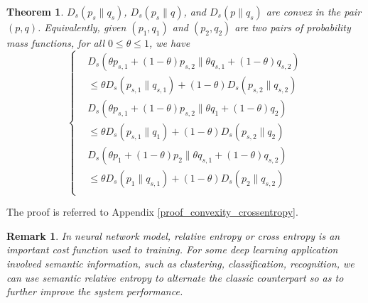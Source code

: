 \documentclass[12pt, draftclsnofoot,onecolumn]{IEEEtran}
\newtheorem{theorem}{\bf{Theorem}}
\newtheorem{remark}{\bf{Remark}}
\begin{document}
\begin{theorem}\label{convexity_crossentropy}
$D_s(p_s\|q_s)$, $D_s(p_s\|q)$, and $D_s(p\|q_s)$ are convex in the pair $(p,q)$. Equivalently, given $(p_1,q_1)$ and $(p_2,q_2)$ are two pairs of probability mass functions, for all $0\leq\theta\leq1$, we have
\begin{equation}
\left\{\begin{aligned}
&D_s(\theta p_{s,1} + (1-\theta) p_{s,2}\| \theta q_{s,1} + (1-\theta) q_{s,2})\\
& \leq \theta D_s(p_{s,1}\|q_{s,1}) +(1-\theta) D_s(p_{s,2}\|q_{s,2})\\
&D_s(\theta p_{s,1} + (1-\theta) p_{s,2}\| \theta q_{1} + (1-\theta) q_{2})\\
& \leq \theta D_s(p_{s,1}\|q_{1}) +(1-\theta) D_s(p_{s,2}\|q_{2})\\
&D_s(\theta p_{1} + (1-\theta) p_{2}\| \theta q_{s,1} + (1-\theta) q_{s,2})\\
& \leq \theta D_s(p_{1}\|q_{s,1}) +(1-\theta) D_s(p_{2}\|q_{s,2})\\
\end{aligned}\right.
\end{equation}
\end{theorem}
The proof is referred to Appendix \ref{proof_convexity_crossentropy}.

\begin{remark}
In neural network model, relative entropy or cross entropy is an important cost function used to training. For some deep learning application involved semantic information, such as clustering, classification, recognition, we can use semantic relative entropy to alternate the classic counterpart so as to further improve the system performance.
\end{remark}
\end{document}
